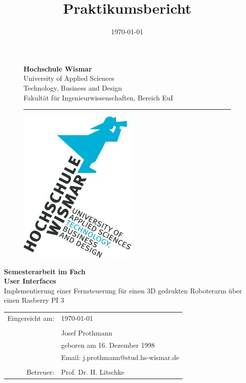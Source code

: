 \documentclass[12pt,					%
							 oneside,			%
							 a4paper,			%
							 halfparskip,		%
							 liststotoc,			%
							 bibtotoc,			%
							 fleqn,				%
							 pointlessnumbers]	%
							 {scrreprt}
\title{Praktikumsbericht}
\author{\Verfasserj}
\date{\today{}}
\makeatletter
\newcommand{\VerfasserJ}{Josef Prothmann}
\newcommand{\EmailJ}{j.prothmann@stud.hs-wismar.de}
\newcommand{\GeburtstagJ}{16. Dezember 1998}
\newcommand{\Titel}{Implementierung einer Fernsteuerung für einen 3D gedrukten Roboterarm über einen Rasberry PI 3}
\newcommand{\Betreuer}{Prof. Dr. H. Litschke}
\makeatother
\begin{document}

	\renewcommand\lstlistingname{Code}
	\renewcommand\lstlistlistingname{Codeverzeichnis}
	
	\begin{titlepage}
		\setlength\headsep{-5mm}
		\begin{figure}[!h]
			\begin{minipage}{0.8\textwidth}
				\textbf{Hochschule Wismar} \\
				University of Applied Sciences \\
				Technology, Business and Design \\
				Fakultät für Ingenieurwissenschaften, Bereich EuI \\
			\rule{\textwidth}{0.5pt}
			\end{minipage}
			\begin{minipage}[r]{0.1\textwidth}
				\begin{flushright}
					\includegraphics[height=6\baselineskip]{pictures/HS-Wismar_Logo-FIW_2010-01.jpg}
				\end{flushright}
			\end{minipage}
		\end{figure}
		\vspace*{6cm}
		\begin{center}
			\Huge
			\textbf{Semesterarbeit im Fach\\ User Interfaces} \\
			\vspace{2cm}
			\large \Titel
			\begin{table}[b]
				\begin{tabular}{rl}
					
					Eingereicht am: &\today \\
					\\
					& \VerfasserJ \\ 
					& geboren am \GeburtstagJ \\ 
					& Email: \EmailJ \\
					\\

					Betreuer: & \Betreuer \\

				\end{tabular}
			\end{table}
		\end{center}
	\end{titlepage}
\end{document}
